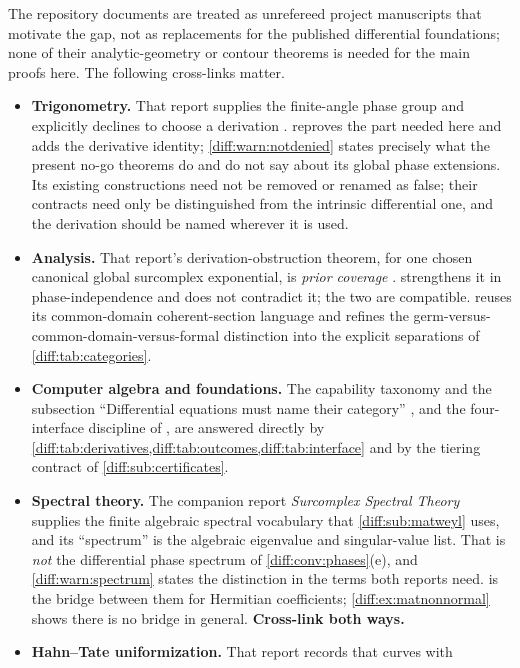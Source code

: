 \documentclass[11pt,letterpaper]{article}
\numberwithin{equation}{section}
\theoremstyle{definition}
\theoremstyle{remark}
\begin{document}
The repository documents are treated as unrefereed project manuscripts that
motivate the gap, not as replacements for the published differential
foundations; none of their analytic-geometry or contour theorems is needed for
the main proofs here. The following cross-links matter.
\begin{itemize}[leftmargin=1.6em]
\item \textbf{Trigonometry.} That report supplies the finite-angle phase group
and explicitly declines to choose a derivation \cite{RepoTrig}.
 reproves the part needed here and adds the
derivative identity; \cref{diff:warn:notdenied} states precisely what the
present no-go theorems do and do not say about its global phase extensions.
Its existing constructions need not be removed or renamed as false; their
contracts need only be distinguished from the intrinsic differential one, and
the derivation should be named wherever it is used.
\item \textbf{Analysis.} That report's derivation-obstruction theorem, for one
chosen canonical global surcomplex exponential, is \emph{prior coverage}
\cite{RepoAnalysis}.  strengthens it in
phase-independence and does not contradict it; the two are compatible.
 reuses its common-domain coherent-section
language and refines the germ-versus-common-domain-versus-formal distinction
into the explicit separations of \cref{diff:tab:categories}.
\item \textbf{Computer algebra and foundations.} The capability taxonomy and
the subsection ``Differential equations must name their category''
\cite{RepoCAS}, and the four-interface discipline of \cite{RepoFound}, are
answered directly by \cref{diff:tab:derivatives,diff:tab:outcomes,diff:tab:interface}
and by the tiering contract of \cref{diff:sub:certificates}.
\item \textbf{Spectral theory.} The companion report \emph{Surcomplex Spectral
Theory} \cite{RepoSpectral} supplies the finite algebraic spectral vocabulary
that \cref{diff:sub:matweyl} uses, and its ``spectrum'' is the algebraic
eigenvalue and singular-value list. That is \emph{not} the differential phase
spectrum of \cref{diff:conv:phases}(e), and
\cref{diff:warn:spectrum} states the distinction in the terms both reports
need.  is the bridge between them for Hermitian
coefficients; \cref{diff:ex:matnonnormal} shows there is no bridge in general.
\textbf{Cross-link both ways.}
\item \textbf{Hahn--Tate uniformization.} That report records that curves with

\end{itemize}
\end{document}
